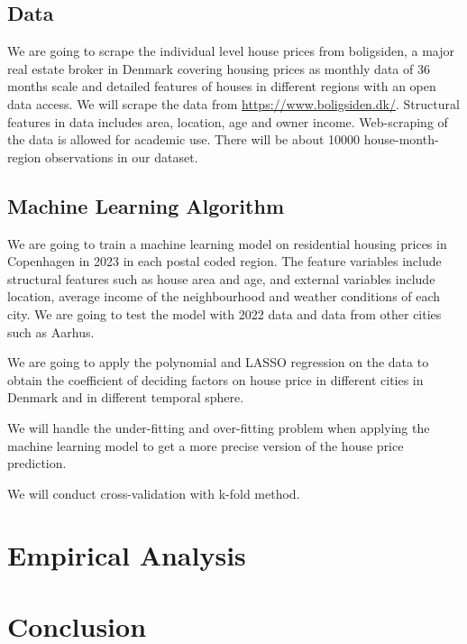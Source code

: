 \documentclass[12pt]{article} %
\begin{document}
	\subsection{Data}
			We are going to scrape the individual level house prices from boligsiden, a major real estate broker in Denmark covering housing prices as monthly data of 36 months scale and detailed features of houses in different regions with an open data access. We will scrape the data from \url{https://www.boligsiden.dk/}. Structural features in data includes area, location, age and owner income. Web-scraping of the data is allowed for academic use. There will be about 10000 house-month-region observations in our dataset. 

	\subsection{Machine Learning Algorithm}
		We are going to train a machine learning model on residential housing prices in Copenhagen in 2023 in each postal coded region. The feature variables include structural features such as house area and age, and external variables include location, average income of the neighbourhood and weather conditions of each city. We are going to test the model with 2022 data and data from other cities such as Aarhus.\par
		We are going to apply the polynomial and LASSO regression on the data to obtain the coefficient of deciding factors on house price in different cities in Denmark and in different temporal sphere.\par
		We will handle the under-fitting and over-fitting problem when applying the machine learning model to get a more precise version of the house price prediction.\par
		We will conduct cross-validation with k-fold method.\par
		
\section{Empirical Analysis}

\section{Conclusion}
	
\newpage	
\footnotesize


\end{document}
